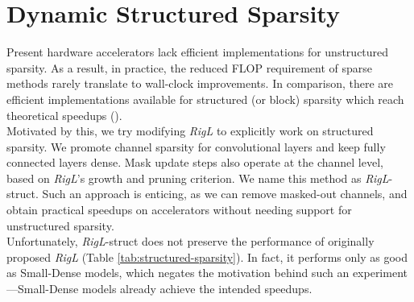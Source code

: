 \section{Dynamic Structured Sparsity}\label{structured-sparsity}



Present hardware accelerators lack efficient implementations for unstructured sparsity. As a result, in practice, the reduced FLOP requirement of sparse methods rarely translate to wall-clock improvements. In comparison, there are efficient implementations available for structured (or block) sparsity which reach theoretical speedups (\citet{gray2017gpu,Vooturi_2019_ICCV}).\\

Motivated by this, we try modifying \textit{RigL} to explicitly work on structured sparsity. We promote channel sparsity for convolutional layers and keep fully connected layers dense. Mask update steps also operate at the channel level, based on \textit{RigL}'s growth and pruning criterion. We name this method as \textit{RigL}-struct. Such an approach is enticing, as we can remove masked-out channels, and obtain practical speedups on accelerators without needing support for unstructured sparsity.\\

Unfortunately, \textit{RigL}-struct does not preserve the performance of originally proposed \textit{RigL} (Table \ref{tab:structured-sparsity}). In fact, it performs only as good as Small-Dense models, which negates the motivation behind such an experiment---Small-Dense models already achieve the intended speedups.